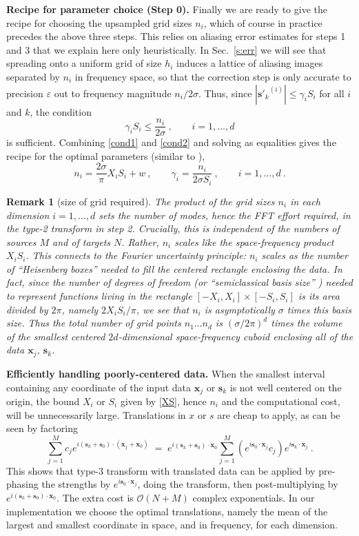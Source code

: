 \documentclass[10pt]{article}
\newcommand{\be}{\begin{equation}}
\newcommand{\ee}{\end{equation}}
\newcommand{\mbf}[1]{{\mathbf #1}}
\newcommand{\eps}{\varepsilon}
\newcommand{\bigO}{{\mathcal O}}
\newtheorem{rmk}[thm]{Remark}
\newcommand{\xx}{\mbf{x}}
\newcommand{\sss}{\mbf{s}}
\newcommand{\rat}{\sigma}          %
\begin{document}
{\bf Recipe for parameter choice (Step 0).}
Finally we are ready to give the recipe for choosing the upsampled grid
sizes $n_i$, which of course in practice precedes the above three steps.
This relies on aliasing error estimates \cite{elbel}
for steps 1 and 3 that we explain here only heuristically.
In Sec.~\ref{s:err} we will see that spreading onto a uniform grid
of size $h_i$ induces a lattice of
aliasing images separated by $n_i$ in frequency space,
so that the correction step is only accurate to precision $\eps$ out to
frequency magnitude $n_i/2\rat$.
Thus, since $|{\sss'_k}^{(i)}| \le \gamma_i S_i$ for all $i$ and $k$,
the condition
\be
\gamma_i S_i \le \frac{n_i}{2\rat}
~,\qquad i=1,\dots,d
\label{cond2}
\ee
is sufficient.
Combining \eqref{cond1} and \eqref{cond2} and solving as equalities
gives the recipe for the optimal parameters (similar to \cite[Rmk.~1]{nufft3}),
\be
n_i = \frac{2\rat}{\pi}X_iS_i + w
~,\qquad
\gamma_i = \frac{n_i}{2\rat S_i}
~,
\qquad i=1,\dots,d
~.
\label{ng}
\ee

\begin{rmk}[size of grid required]
  The product of the grid sizes $n_i$ in each dimension $i=1,\dots,d$
  sets the number of modes, hence the FFT effort required,
  in the type-2 transform in step 2.
Crucially,  this is independent of the numbers of sources $M$ and of
  targets $N$.
  Rather, $n_i$ scales like the space-frequency product $X_iS_i$.
  This connects to the Fourier uncertainty principle:
  $n_i$ scales as the number of ``Heisenberg boxes''
  needed to fill the centered rectangle enclosing the data.
  In fact, since the number of degrees of freedom \cite[p.~391]{slepianrev}
  (or ``semiclassical basis size'' \cite{davisheller})
  needed to represent functions
  living in the rectangle $[-X_i,X_i]\times[-S_i,S_i]$ is its area divided
  by $2\pi$, namely $2X_iS_i/\pi$, we see that
  $n_i$ is asymptotically $\rat$ times this basis size.
  Thus the total number of grid points $n_1\dots n_d$ is $(\rat/2\pi)^d$
  times the volume of the smallest centered $2d$-dimensional space-frequency
  cuboid enclosing all of the data $\xx_j$, $\sss_k$.
  \label{r:heis}
\end{rmk}

{\bf Efficiently handling poorly-centered data.}
When the smallest interval containing any coordinate of the input data
$\xx_j$ or $\sss_k$
is not well centered on the origin, the bound $X_i$ or $S_i$ given
by \eqref{XS}, hence $n_i$ and the computational cost,
will be unnecessarily large.
Translations in $x$ or $s$ are cheap to apply,
as can be seen by factoring
\be
\sum_{j=1}^M c_j e^{i (\sss_k+\sss_0) \cdot (\xx_j+\xx_0)}
\;= \;
e^{i(\sss_k+\sss_0)\cdot\xx_0} \sum_{j=1}^M (e^{i\sss_0\cdot \xx_j}c_j) e^{i \sss_k\cdot\xx_j}~.
\label{trans}
\ee
This shows that type-3 transform with translated data
can be applied by pre-phasing the strengths by $e^{i\sss_0\cdot \xx_j}$,
doing the transform, then post-multiplying by $e^{i(\sss_k+\sss_0)\cdot\xx_0}$.
The extra cost is $\bigO(N+M)$ complex exponentials.
In our implementation we
choose the optimal translations, namely the mean of the largest and
smallest coordinate in space, and in frequency, for each dimension.
\end{document}
